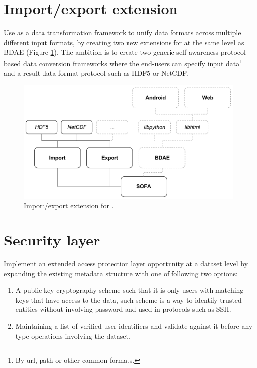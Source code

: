 \section{Import/export extension}
Use \CodeName as a data transformation framework to unify data formats across multiple different input formats, by creating two new extensions for \CodeName at the same level as BDAE (Figure \ref{fig:bdae-extension}). The ambition is to create two generic self-awareness protocol-based data conversion frameworks where the end-users can specify input data\footnote{By url, path or other common formats.} and a result data format protocol such as HDF5 or NetCDF.

\begin{figure}
	\centering
	\includegraphics[scale=0.7]{pdf/bdae-extension.pdf}
	\caption{Import/export extension for \CodeName. \label{fig:bdae-extension}}
\end{figure}

\section{Security layer}
Implement an extended access protection layer opportunity at a dataset level by expanding the existing metadata structure with one of following two options:
\begin{enumerate}
	\item A public-key cryptography scheme such that it is only users with matching keys that have access to the data, such scheme is a way to identify trusted entities without involving password and used in protocols such as SSH.
	\item Maintaining a list of verified user identifiers and validate against it before any type operations involving the dataset.
\end{enumerate}

